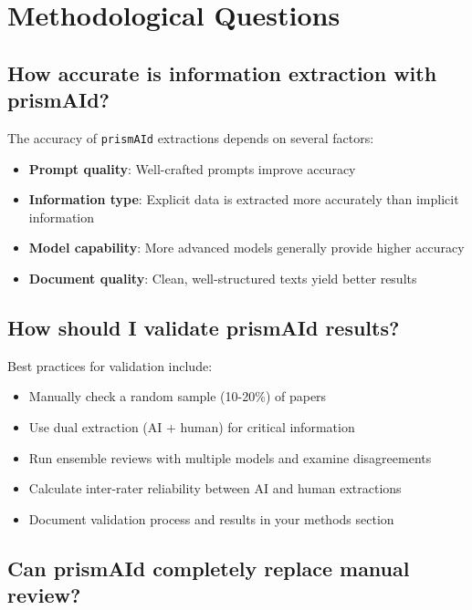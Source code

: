 \section{Methodological Questions}

\subsection{How accurate is information extraction with prismAId?}

The accuracy of \texttt{prismAId} extractions depends on several factors:

\begin{itemize}
    \item \textbf{Prompt quality}: Well-crafted prompts improve accuracy
    \item \textbf{Information type}: Explicit data is extracted more accurately than implicit information
    \item \textbf{Model capability}: More advanced models generally provide higher accuracy
    \item \textbf{Document quality}: Clean, well-structured texts yield better results
\end{itemize}

\subsection{How should I validate prismAId results?}

Best practices for validation include:

\begin{itemize}
    \item Manually check a random sample (10-20\%) of papers
    \item Use dual extraction (AI + human) for critical information
    \item Run ensemble reviews with multiple models and examine disagreements
    \item Calculate inter-rater reliability between AI and human extractions
    \item Document validation process and results in your methods section
\end{itemize}

\subsection{Can prismAId completely replace manual review?}

